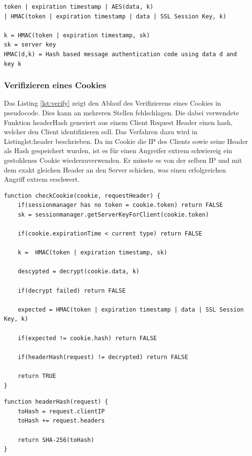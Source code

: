 \begin{lstlisting}[caption=Innere Struktur des Cookie,label={lst:cookie}]
token | expiration timestamp | AES(data, k) 
| HMAC(token | expiration timestamp | data | SSL Session Key, k)

k = HMAC(token | expiration timestamp, sk)
sk = server key
HMAC(d,k) = Hash based message authentication code using data d and key k
\end{lstlisting}

\subsubsection{Verifizieren eines Cookies}

Das Listing \ref{lst:verify} zeigt den Ablauf des Verifizierens eines Cookies in pseudocode. 
Dies kann an mehreren Stellen fehlschlagen. Die dabei verwendete Funktion headerHash generiert 
aus einem Client Request Header einen hash, welcher den Client identifizieren soll. Das Verfahren
dazu wird in Listing{lst:header} beschrieben. Da im Cookie die IP des Clients sowie seine Header
als Hash gespeichert wurden, ist es für einen Angreifer extrem schwiereig ein gestohlenes Cookie
wiederzuverwenden. Er müsste es von der selben IP und mit dem exakt gleichen Header an den Server
schicken, was einen erfolgreichen Angriff extrem erschwert.
\newline
\begin{lstlisting}[caption=Verifikation eines Cookies,label={lst:verify}]
function checkCookie(cookie, requestHeader) {
    if(sessionmanager has no token = cookie.token) return FALSE
    sk = sessionmanager.getServerKeyForClient(cookie.token)

    if(cookie.expirationTime < current type) return FALSE

    k =  HMAC(token | expiration timestamp, sk)

    descypted = decrypt(cookie.data, k)

    if(decrypt failed) return FALSE

    expected = HMAC(token | expiration timestamp | data | SSL Session Key, k)

    if(expected != cookie.hash) return FALSE

    if(headerHash(request) != decrypted) return FALSE

    return TRUE
}
\end{lstlisting}
\newpage
\begin{lstlisting}[caption=Hashen des Headers eines Client Requests,label={lst:verify}]
function headerHash(request) {
    toHash = request.clientIP
    toHash += request.headers

    return SHA-256(toHash) 
}
\end{lstlisting}

